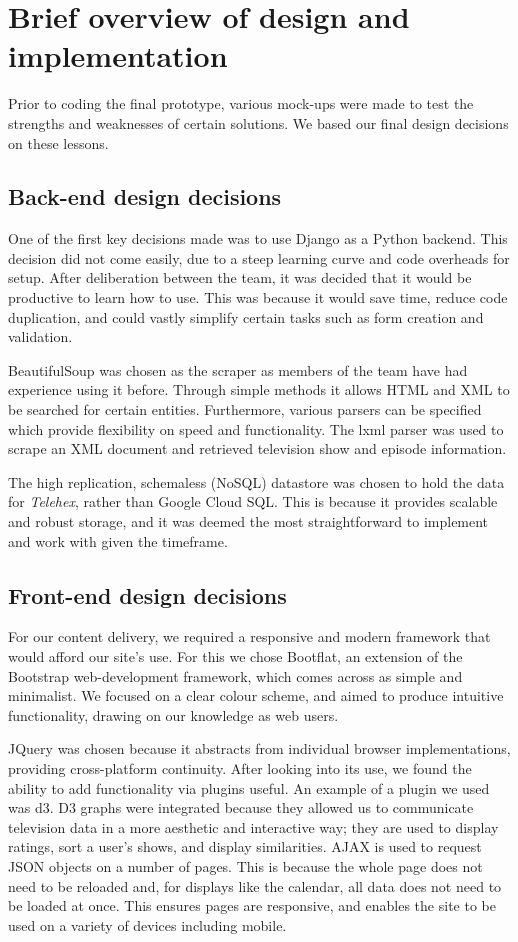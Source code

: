 \documentclass[12pt, a4paper]{article}
\begin{document}
\newpage
\section{Brief overview of design and implementation}
Prior to coding the final prototype, various mock-ups were made to test the strengths and weaknesses of certain solutions. We based our final design decisions on these lessons.

\subsection{Back-end design decisions}

One of the first key decisions made was to use Django as a Python backend. This decision did not come easily, due to a steep learning curve and code overheads for setup. After deliberation between the team, it was decided that it would be productive to learn how to use. This was because it would save time, reduce code duplication, and could vastly simplify certain tasks such as form creation and validation.

BeautifulSoup was chosen as the scraper as members of the team have had experience using it before. Through simple methods it allows HTML and XML to be searched for certain entities. Furthermore, various parsers can be specified which provide flexibility on speed and functionality. The lxml parser was used to scrape an XML document and retrieved television show and episode information.

The high replication, schemaless (NoSQL) datastore was chosen to hold the data for \textit{Telehex}, rather than Google Cloud SQL. This is because it provides scalable and robust storage, and it was deemed the most straightforward to implement and work with given the timeframe.


\subsection{Front-end design decisions}

For our content delivery, we required a responsive and modern framework that would afford our site's use. For this we chose Bootflat, an extension of the Bootstrap web-development framework, which comes across as simple and minimalist. We focused on a clear colour scheme, and aimed to produce intuitive functionality, drawing on our knowledge as web users. 

JQuery was chosen because it abstracts from individual browser implementations, providing cross-platform continuity. After looking into its use, we found the ability to add functionality via plugins useful. An example of a plugin we used was d3. D3 graphs were integrated because they allowed us to communicate television data in a more aesthetic and interactive way; they are used to display ratings, sort a user's shows, and display similarities. AJAX is used to request JSON objects on a number of pages. This is because the whole page does not need to be reloaded and, for displays like the calendar, all data does not need to be loaded at once. This ensures pages are responsive, and enables the site to be used on a variety of devices including mobile.
\end{document}
